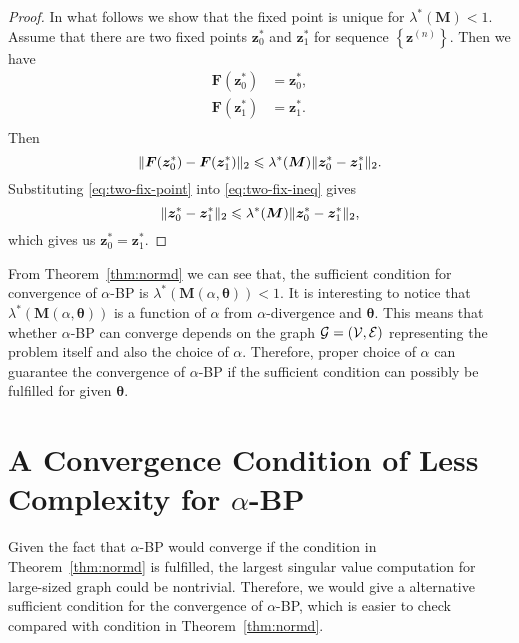 \documentclass[conference,onecolumn]{IEEEtran}
\begin{document}
\begin{proof}
  In what follows we show that the fixed point is unique for $\lambda^{\ast}(\bm{M})<1$. Assume that there are two fixed points $\bm{z}_0^{\ast}$ and $\bm{z}_1^{\ast}$ for sequence $\left\{ \bm{z}^{(n)} \right\}$. Then we have
  \begin{align}\label{eq:two-fix-point}
    \bm{F}(\bm{z}_0^{\ast}) &= \bm{z}_0^{\ast}, \nonumber \\
    \bm{F}(\bm{z}_1^{\ast}) &= \bm{z}_1^{\ast}. \nonumber \\
  \end{align}
  Then
  \begin{equation}\label{eq:two-fix-ineq}
    \| \bm{F}(\bm{z}_0^{\ast}) - \bm{F}(\bm{z}_1^{\ast}) \|_{2} \leqslant
    \lambda^{\ast}(\bm{M})\| \bm{z}_0^{\ast} - \bm{z}_1^{\ast} \|_{2}.
  \end{equation}
  Substituting \eqref{eq:two-fix-point} into \eqref{eq:two-fix-ineq}
  gives
  \begin{equation}\label{eq:two-fix-ineq}
    \| \bm{z}_0^{\ast} - \bm{z}_1^{\ast} \|_{2} \leqslant
    \lambda^{\ast}(\bm{M})\| \bm{z}_0^{\ast} - \bm{z}_1^{\ast} \|_{2},
  \end{equation}
  which gives us $\bm{z}_0^{\ast} = \bm{z}_1^{\ast}$.
\end{proof}

\begin{rem}
  From Theorem~\ref{thm:normd} we can see that, the sufficient condition for convergence of $\alpha$-BP is $\lambda^{\ast}(\bm{M}(\alpha, \bm{\theta})) < 1$. It is interesting to notice that $\lambda^{\ast}(\bm{M}(\alpha, \bm{\theta}))$ is a function of $\alpha$ from $\alpha$-divergence and $\bm{\theta}$. This means that whether $\alpha$-BP can converge depends on the graph $\mathcal{G}= (\mathcal{V}, \mathcal{E})$ representing the problem itself and also the choice of $\alpha$. Therefore, proper choice of $\alpha$ can guarantee the convergence of $\alpha$-BP if the sufficient condition can possibly be fulfilled for given $\bm{\theta}$.
\end{rem}

\section{A Convergence Condition of Less Complexity for $\alpha$-BP}
Given the fact that $\alpha$-BP would converge if the condition in Theorem~\ref{thm:normd} is fulfilled, the largest singular value computation for large-sized graph could be nontrivial. Therefore, we would give a alternative sufficient condition for the convergence of $\alpha$-BP, which is easier to check compared with condition in Theorem~\ref{thm:normd}.
\end{document}
